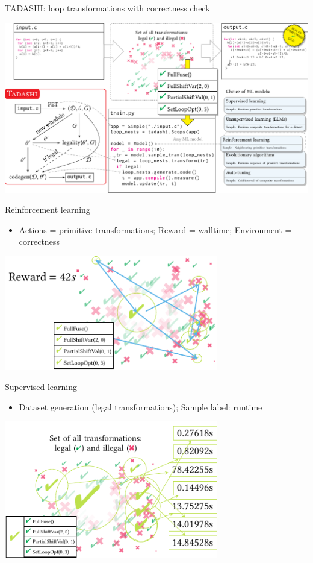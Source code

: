 \documentclass[presentation, aspectratio=169]{beamer}
\begin{document}
\begin{frame}[label={sec:org9267814}]{TADASHI: \alert{loop transformations} with correctness check}
\begin{center}
\includegraphics[width=.9\linewidth]{./figs/sampling.pdf}
\end{center}
\end{frame}
\begin{frame}[label={sec:orgd301fd7}]{Reinforcement learning}
\begin{itemize}
\item Actions = primitive transformations; Reward = walltime; Environment = correctness
\end{itemize}
\begin{center}
\includegraphics[width=0.7\textwidth]{./figs/ml-rl.pdf}
\end{center}
\end{frame}
\begin{frame}[label={sec:org4ac978c}]{Supervised learning}
\begin{itemize}
\item Dataset generation (legal transformations); Sample label: runtime
\end{itemize}
\begin{center}
\includegraphics[width=0.7\textwidth]{./figs/ml-sl.pdf}
\end{center}
\end{frame}
\end{document}
